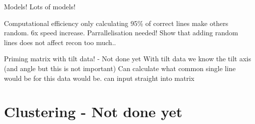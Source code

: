 \documentclass[t, 11pt]{beamer}
\begin{document}
\begin{frame}[fragile]{Models!}
  Lots of models!
\end{frame}

\begin{frame}[fragile]{Computational efficiency}
  only calculating 95\% of correct lines make others random. 6x speed increase. Parrallelisation needed!
  Show that adding random lines does not affect recon too much..
\end{frame}

\begin{frame}[fragile]{Priming matrix with tilt data! - Not done yet}
  With tilt data we know the tilt axis (and angle but this is not important)
  Can calculate what common single line would be for this data would be. can input straight into matrix
\end{frame}


\section{Clustering - Not done yet}
\end{document}
